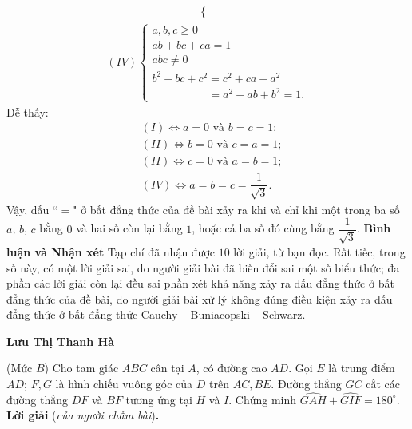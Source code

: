 \begin{multicols}{2}
\begin{align*}
\begin{cases}
		\end{cases}
	\end{align*}
	\begin{align*}
		(IV)\begin{cases}
				a,b,c \ge 0\\
				ab + bc + ca = 1\\
				abc \ne 0\\
				{b^2} + bc + {c^2} = {c^2} + ca + {a^2} \\
				\quad\quad\quad\quad\quad= {a^2} + ab + {b^2} = 1.
		\end{cases}
	\end{align*}
	Dễ thấy:
	\begin{align*}
		&(I) \Leftrightarrow a = 0 \text{ và } b = c = 1;\\
		&(II) \Leftrightarrow b = 0 \text{ và } c = a = 1;\\
		&(II) \Leftrightarrow c = 0 \text{ và } a = b = 1;\\
		&(IV) \Leftrightarrow a=b=c= \dfrac{1}{\sqrt{3}}.
	\end{align*}
	Vậy, dấu ``$=$" ở bất đẳng thức của đề bài xảy ra khi và chỉ khi một trong ba số $a$, $b$, $c$ bằng $0$ và hai số còn lại bằng $1$, hoặc cả ba số đó cùng bằng  $\dfrac{1}{\sqrt{3}}$.
	\vskip 0.05cm
	\textbf{\color{thachthuctoanhoc}Bình luận và Nhận xét}
	\vskip 0.05cm
	Tạp chí đã nhận được $10$ lời giải, từ bạn đọc. Rất tiếc, trong số này, có một lời giải sai, do người giải bài đã biến đổi sai một số biểu thức; đa phần các lời giải còn lại đều sai phần xét khả năng xảy ra dấu đẳng thức ở bất đẳng thức của đề bài, do người giải bài xử lý không đúng điều kiện xảy ra dấu đẳng thức ở bất đẳng thức Cauchy -- Buniacopski -- Schwarz.
	\begin{flushright}
		\textbf{\color{thachthuctoanhoc}Lưu Thị Thanh Hà}
	\end{flushright}
	{}
	(Mức $B$) Cho tam giác $ABC$ cân tại $A$, có đường cao $AD$. Gọi $E$ là trung điểm $AD$; $F,G$ là hình chiếu vuông góc của $D$ trên $AC,BE$. Đường thẳng $GC$ cắt các đường thẳng $DF$ và $BF$ tương ứng tại $H$ và $I$. Chứng minh $\widehat{GAH}+\widehat{GIF}=180^\circ$.  
	\vskip 0.05cm
	\textbf{\color{thachthuctoanhoc}Lời giải} (\textit{của người chấm bài})\textbf{\color{thachthuctoanhoc}.}
	\begin{figure}[H]
		\vspace*{-5pt}
		\centering
		\captionsetup{labelformat= empty, justification=centering}

\end{figure}
\end{multicols}
